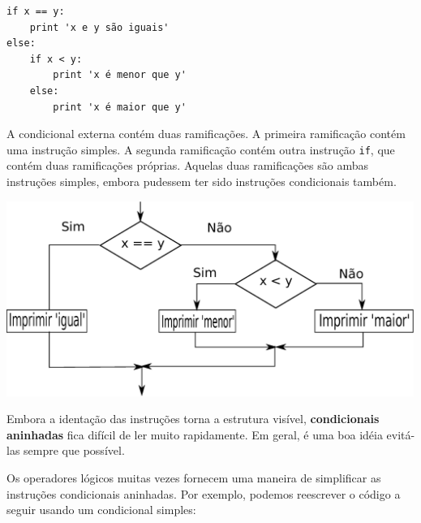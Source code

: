\beforeverb
\begin{verbatim}
if x == y:
    print 'x e y são iguais'
else:
    if x < y:
        print 'x é menor que y'
    else:
        print 'x é maior que y'
\end{verbatim}
\afterverb
%
A condicional externa contém duas ramificações. A
primeira ramificação contém uma instrução simples. A segunda ramificação
contém outra instrução {\tt if}, que contém duas ramificações
próprias. Aquelas duas ramificações são ambas instruções simples,
embora pudessem ter sido instruções condicionais também.


\beforefig
\centerline{\includegraphics[height=2.50in]{figs2/nested.eps}}
\afterfig


Embora a identação das instruções torna a estrutura
visível, {\bf condicionais aninhadas} fica difícil de ler muito
rapidamente. Em geral, é uma boa idéia evitá-las sempre que possível.



Os operadores lógicos muitas vezes fornecem uma maneira de simplificar as instruções
condicionais aninhadas. Por exemplo, podemos reescrever o código a seguir usando um
condicional simples:

